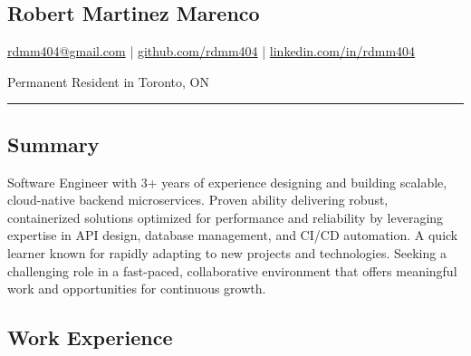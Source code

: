 \documentclass[a4paper,10pt]{article}
\begin{document}
\pagestyle{empty}

\begin{center}
  \section*{\LARGE Robert Martinez Marenco}
  \href{mailto:rdmm404@gmail.com}{rdmm404@gmail.com} |
  \href{https://github.com/rdmm404}{github.com/rdmm404} |
  \href{https://linkedin.com/in/rdmm404}{linkedin.com/in/rdmm404}

  Permanent Resident in Toronto, ON
\end{center}

\hrule
\vspace{4pt}

\subsection*{Summary}
Software Engineer with 3+ years of experience designing and building scalable, cloud-native backend microservices.
Proven ability delivering robust, containerized solutions optimized for performance and reliability
by leveraging expertise in API design, database management, and CI/CD automation. A quick learner
known for rapidly adapting to new projects and technologies. Seeking a challenging role in a fast-paced,
collaborative environment that offers meaningful work and opportunities for continuous growth.
\subsection*{Work Experience}
\end{document}
